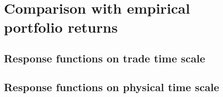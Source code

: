 \section{Comparison with empirical portfolio returns}
\label{sec:comparison_returns}



\subsection{Response functions on trade time scale}
\label{subsec:response_function_trade}


\subsection{Response functions on physical time scale}
\label{subsec:response_function_physical}
